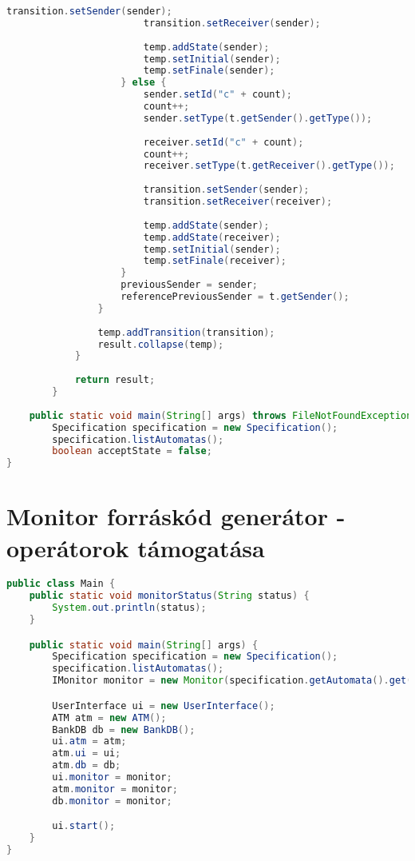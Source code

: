 \begin{lstlisting}[language=java, caption={\textit{Specification} osztály.},captionpos=b,label=specification_class]
                        transition.setSender(sender);
                        transition.setReceiver(sender);
    
                        temp.addState(sender);
                        temp.setInitial(sender);
                        temp.setFinale(sender);
                    } else {
                        sender.setId("c" + count);
                        count++;
                        sender.setType(t.getSender().getType());
    
                        receiver.setId("c" + count);
                        count++;
                        receiver.setType(t.getReceiver().getType());
    
                        transition.setSender(sender);
                        transition.setReceiver(receiver);
    
                        temp.addState(sender);
                        temp.addState(receiver);
                        temp.setInitial(sender);
                        temp.setFinale(receiver);
                    }
                    previousSender = sender;
                    referencePreviousSender = t.getSender();
                }
    
                temp.addTransition(transition);
                result.collapse(temp);
            }
    
            return result;
        }
	
	public static void main(String[] args) throws FileNotFoundException, UnsupportedEncodingException{
		Specification specification = new Specification();
		specification.listAutomatas();
		boolean acceptState = false;
}
\end{lstlisting}

\clearpage\section{Monitor forráskód generátor - operátorok támogatása}

\begin{lstlisting}[language=java, frame=single, float=ht!, caption={7.1. szcenárióhoz tartozó Main osztály.},captionpos=b]
public class Main {
	public static void monitorStatus(String status) {
		System.out.println(status);
	}

	public static void main(String[] args) {
		Specification specification = new Specification();
		specification.listAutomatas();
		IMonitor monitor = new Monitor(specification.getAutomata().get(0));

		UserInterface ui = new UserInterface();
		ATM atm = new ATM();
		BankDB db = new BankDB();
		ui.atm = atm;
		atm.ui = ui;
		atm.db = db;
		ui.monitor = monitor;
		atm.monitor = monitor;
		db.monitor = monitor;

		ui.start();
	}
}
\end{lstlisting}

